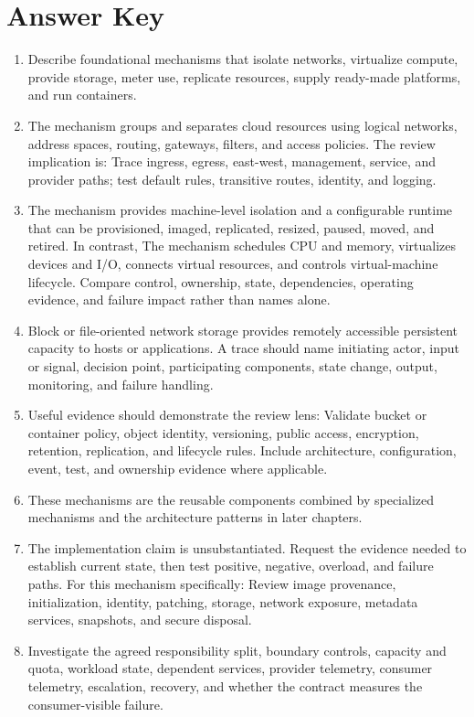 \documentclass[11pt]{article}
\begin{document}
\section{Answer Key}
\begin{enumerate}
\item Describe foundational mechanisms that isolate networks, virtualize compute, provide storage, meter use, replicate resources, supply ready-made platforms, and run containers.
\item The mechanism groups and separates cloud resources using logical networks, address spaces, routing, gateways, filters, and access policies. The review implication is: Trace ingress, egress, east-west, management, service, and provider paths; test default rules, transitive routes, identity, and logging.
\item The mechanism provides machine-level isolation and a configurable runtime that can be provisioned, imaged, replicated, resized, paused, moved, and retired. In contrast, The mechanism schedules CPU and memory, virtualizes devices and I/O, connects virtual resources, and controls virtual-machine lifecycle. Compare control, ownership, state, dependencies, operating evidence, and failure impact rather than names alone.
\item Block or file-oriented network storage provides remotely accessible persistent capacity to hosts or applications. A trace should name initiating actor, input or signal, decision point, participating components, state change, output, monitoring, and failure handling.
\item Useful evidence should demonstrate the review lens: Validate bucket or container policy, object identity, versioning, public access, encryption, retention, replication, and lifecycle rules. Include architecture, configuration, event, test, and ownership evidence where applicable.
\item These mechanisms are the reusable components combined by specialized mechanisms and the architecture patterns in later chapters.
\item The implementation claim is unsubstantiated. Request the evidence needed to establish current state, then test positive, negative, overload, and failure paths. For this mechanism specifically: Review image provenance, initialization, identity, patching, storage, network exposure, metadata services, snapshots, and secure disposal.
\item Investigate the agreed responsibility split, boundary controls, capacity and quota, workload state, dependent services, provider telemetry, consumer telemetry, escalation, recovery, and whether the contract measures the consumer-visible failure.

\end{enumerate}
\end{document}
